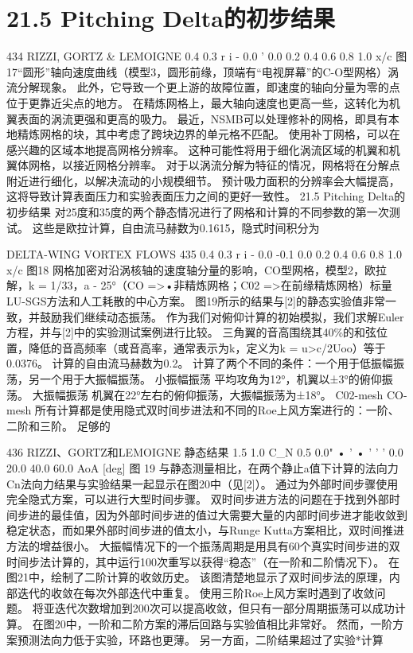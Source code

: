 \documentclass[UTF8,11pt,a4paper,openany,fontset=fandol]{ctexbook}
\begin{document}
\section{21.5 Pitching Delta的初步结果}
434 RIZZI, GORTZ \& LEMOIGNE 0.4 0.3 r i - 0.0 ' 0.0 0.2 0.4 0.6 0.8 1.0 x/c 图17“圆形”轴向速度曲线（模型3，圆形前缘，顶端有“电视屏幕”的C-O型网格）涡流分解现象。 此外，它导致一个更上游的故障位置，即速度的轴向分量为零的点位于更靠近尖点的地方。 在精炼网格上，最大轴向速度也更高一些，这转化为机翼表面的涡流更强和更高的吸力。 最近，NSMB可以处理修补的网格，即具有本地精炼网格的块，其中考虑了跨块边界的单元格不匹配。 使用补丁网格，可以在感兴趣的区域本地提高网格分辨率。 这种可能性将用于细化涡流区域的机翼和机翼体网格，以接近网格分辨率。 对于以涡流分解为特征的情况，网格将在分解点附近进行细化，以解决流动的小规模细节。 预计吸力面积的分辨率会大幅提高，这将导致计算表面压力和实验表面压力之间的更好一致性。 21.5 Pitching Delta的初步结果 对25度和35度的两个静态情况进行了网格和计算的不同参数的第一次测试。 这些是欧拉计算，自由流马赫数为0.1615，隐式时间积分为

DELTA-WING VORTEX FLOWS 435 0.4 0.3 r i - 0.0 -0.1 0.0 0.2 0.4 0.6 0.8 1.0 x/c 图18 网格加密对沿涡核轴的速度轴分量的影响，CO型网格，模型2，欧拉解，k = 1/33，a - 25°（CO =>•非精炼网格；C02 =>在前缘精炼网格）标量LU-SGS方法和人工耗散的中心方案。 图19所示的结果与[2]的静态实验值非常一致，并鼓励我们继续动态振荡。 作为我们对俯仰计算的初始模拟，我们求解Euler 方程，并与[2]中的实验测试案例进行比较。 三角翼的音高围绕其40\%的和弦位置，降低的音高频率（或音高率，通常表示为k，定义为k = u>c/2Uoo）等于0.0376。 计算的自由流马赫数为0.2。 计算了两个不同的条件：一个用于低振幅振荡，另一个用于大振幅振荡。 小振幅振荡 平均攻角为12°，机翼以±3°的俯仰振荡。 大振幅振荡 机翼在22°左右的俯仰振荡，大振幅振荡为±18°。 C02-mesh CO-mesh 所有计算都是使用隐式双时间步进法和不同的Roe上风方案进行的：一阶、二阶和三阶。 足够的

436 RIZZI、GORTZ和LEMOIGNE 静态结果 1.5 1.0 C\_N 0.5 0.0" • ' • ' ' ' 0.0 20.0 40.0 60.0 AoA [deg] 图 19 与静态测量相比，在两个静止a值下计算的法向力Cn法向力结果与实验结果一起显示在图20中（见[2]）。 通过为外部时间步骤使用完全隐式方案，可以进行大型时间步骤。 双时间步进方法的问题在于找到外部时间步进的最佳值，因为外部时间步进的值过大需要大量的内部时间步进才能收敛到稳定状态，而如果外部时间步进的值太小，与Runge Kutta方案相比，双时间推进方法的增益很小。 大振幅情况下的一个振荡周期是用具有60个真实时间步进的双时间步法计算的，其中运行100次重写以获得“稳态”（在一阶和二阶情况下）。 在图21中，绘制了二阶计算的收敛历史。 该图清楚地显示了双时间步法的原理，内部迭代的收敛在每次外部迭代中重复。 使用三阶Roe上风方案时遇到了收敛问题。 将亚迭代次数增加到200次可以提高收敛，但只有一部分周期振荡可以成功计算。 在图20中，一阶和二阶方案的滞后回路与实验值相比非常好。 然而，一阶方案预测法向力低于实验，环路也更薄。 另一方面，二阶结果超过了实验*计算
\end{document}
